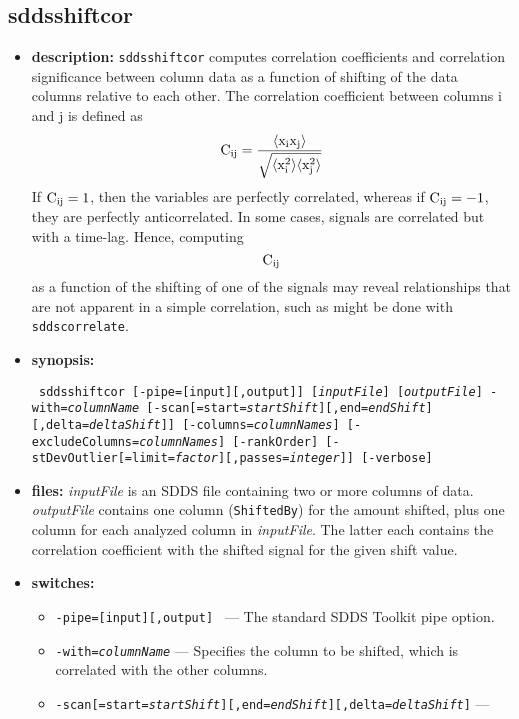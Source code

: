 \newpage
\subsection{sddsshiftcor}
\label{sddsshiftcor}

\begin{itemize}
\item {\bf description:} 
{\tt sddsshiftcor} computes correlation coefficients and correlation
significance between column data as a function of shifting of the data columns
relative to each other.  The correlation coefficient between
columns i and j is defined as
\[ {\rm C_{ij} = \frac{\langle x_i x_j \rangle}{\sqrt{\langle x_i^2\rangle\langle x_j^2 \rangle}}} \]
If ${\rm C_{ij}=1}$, then the variables are perfectly correlated, whereas if ${\rm C_{ij}=-1}$, they
are perfectly anticorrelated.
In some cases, signals are correlated but with a time-lag.  Hence, computing \[ {\rm C_{ij}} \]
as a function of the shifting of one of the signals may reveal relationships that are not
apparent in a simple correlation, such as might be done with {\tt sddscorrelate}.
\item {\bf synopsis:}
\begin{flushleft}{\tt
sddsshiftcor [-pipe=[input][,output]] [{\em inputFile}] [{\em outputFile}] 
-with={\em columnName} 
[-scan[=start={\em startShift}][,end={\em endShift}][,delta={\em deltaShift}]]
[-columns={\em columnNames}] [-excludeColumns={\em columnNames}] 
[-rankOrder] [-stDevOutlier[=limit={\em factor}][,passes={\em integer}]]
[-verbose]
}\end{flushleft}
\item {\bf files:}
        {\em inputFile} is an SDDS file containing two or more columns of data.  {\em outputFile}
        contains one column ({\tt ShiftedBy}) for the amount shifted, plus one column for
        each analyzed column in {\em inputFile}.  The latter each contains the correlation
        coefficient with the shifted signal for the given shift value.
\item {\bf switches:}
    \begin{itemize}
    \item {\tt -pipe=[input][,output] } --- The standard SDDS Toolkit pipe option.
    \item {\tt -with={\em columnName}} --- Specifies the column to be shifted, which is correlated
        with the other columns.
    \item {\tt -scan[=start={\em startShift}][,end={\em endShift}][,delta={\em deltaShift}]} --- 

\end{itemize}
\end{itemize}
